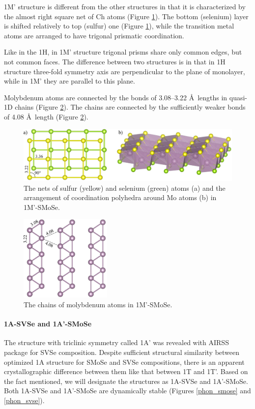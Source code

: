 \documentclass[a4paperm]{article}
\begin{document}
1M' structure is different from the other structures in that it is characterized by the almost right square net of Ch atoms (Figure \ref{H-hor}).
The bottom (selenium) layer is shifted relatively to top (sulfur) one (Figure \ref{H-hor}), while the transition metal atoms are arranged to have trigonal prismatic coordination.

Like in the 1H, in 1M' structure trigonal prisms share only common edges, but not common faces.
The difference between two structures is in that in 1H structure three-fold symmetry axis are perpendicular to the plane of monolayer, while in 1M' they are parallel to this plane.

Molybdenum atoms are connected by the bonds of 3.08--3.22 \AA\ lengths in quasi-1D chains (Figure \ref{H-hor_Mo}).
The chains are connected by the sufficiently weaker bonds of 4.08 \AA\ length (Figure \ref{H-hor_Mo}).


\begin{figure}[H]
	\includegraphics[width=\textwidth]{H-hor.png}
	\caption{The nets of sulfur (yellow) and selenium (green) atoms (a) and the arrangement of coordination polyhedra around Mo atoms (b) in 1M'-SMoSe.}
	\label{H-hor}
\end{figure} 


\begin{figure}[H]
	\includegraphics[width=0.4\textwidth]{H-hor_Mo.png}
	\caption{The chains of molybdenum atoms in 1M'-SMoSe.}
	\label{H-hor_Mo}
\end{figure} 


\paragraph{1A-SVSe and 1A'-SMoSe}
The structure with triclinic symmetry called 1A' was revealed with AIRSS package for SVSe composition.
Despite sufficient structural similarity between optimized 1A structure for SMoSe and SVSe compositions, there is an apparent crystallographic difference between them like that between 1T and 1T'.
Based on the fact mentioned, we will designate the structures as 1A-SVSe and 1A'-SMoSe.
Both 1A-SVSe and 1A'-SMoSe are dynamically stable (Figures \ref{phon_smose} and \ref{phon_svse}).
\end{document}
